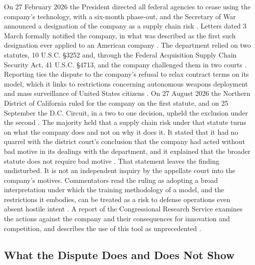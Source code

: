 \documentclass[12pt]{article}
\theoremstyle{definition}
\theoremstyle{remark}
\begin{document}
On 27 February 2026 the President directed all federal agencies to cease using the company's technology, with a six-month phase-out, and the Secretary of War announced a designation of the company as a supply chain risk \cite{mayerbrown2026}. Letters dated 3 March formally notified the company, in what was described as the first such designation ever applied to an American company \cite{mayerbrown2026}. The department relied on two statutes, 10 U.S.C. \S 3252 and, through the Federal Acquisition Supply Chain Security Act, 41 U.S.C. \S 4713, and the company challenged them in two courts \cite{taft2026}. Reporting ties the dispute to the company's refusal to relax contract terms on its model, which it links to restrictions concerning autonomous weapons deployment and mass surveillance of United States citizens \cite{kucoin2026,nextweb2026}. On 27 August 2026 the Northern District of California ruled for the company on the first statute, and on 25 September the D.C. Circuit, in a two to one decision, upheld the exclusion under the second \cite{taft2026}. The majority held that a supply chain risk under that statute turns on what the company does and not on why it does it. It stated that it had no quarrel with the district court's conclusion that the company had acted without bad motive in its dealings with the department, and it explained that the broader statute does not require bad motive \cite{dcc2026,ctv2026,steptoe2026}. That statement leaves the finding undisturbed. It is not an independent inquiry by the appellate court into the company's motives. Commentators read the ruling as adopting a broad interpretation under which the training methodology of a model, and the restrictions it embodies, can be treated as a risk to defense operations even absent hostile intent \cite{hk2026}. A report of the Congressional Research Service examines the actions against the company and their consequences for innovation and competition, and describes the use of this tool as unprecedented \cite{crs2026}.

\subsection{What the Dispute Does and Does Not Show}
\end{document}
